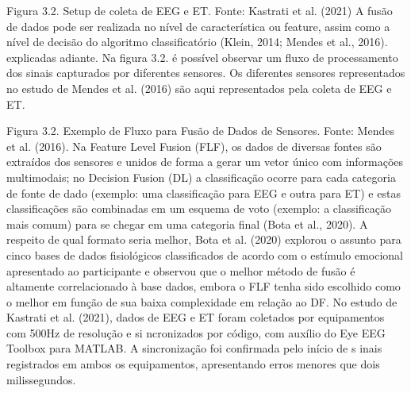Figura 3.2. Setup de coleta de EEG e ET. Fonte: Kastrati et al. (2021)
A fusão de dados pode ser realizada no nível de característica ou feature,
assim como a nível de decisão do algoritmo classificatório (Klein, 2014; Mendes et al., 2016).  explicadas adiante.
      Na figura 3.2. é possível observar um fluxo de processamento dos sinais capturados por diferentes sensores.  Os diferentes 
      sensores representados no estudo de Mendes et al. (2016) são aqui representados pela coleta de EEG e ET.
 

Figura 3.2. Exemplo de Fluxo para Fusão de Dados de Sensores. Fonte:  Mendes et al. (2016).
Na Feature Level Fusion (FLF), os dados de diversas fontes são extraídos dos sensores e unidos de forma a 
gerar um vetor único com informações multimodais; no Decision Fusion (DL) a classificação ocorre para cada categoria 
de fonte de dado (exemplo: uma classificação para EEG e outra para ET) e estas classificações são combinadas em um esquema de voto (exemplo: a classificação mais comum) para se chegar em uma categoria final (Bota et al., 2020). A respeito de qual formato seria melhor, Bota et al. (2020) explorou o assunto para cinco bases de dados fisiológicos classificados de acordo com o estímulo emocional apresentado ao participante e observou que o melhor método de fusão é altamente correlacionado à base dados, embora o FLF tenha sido escolhido como o melhor em função de sua baixa complexidade em relação ao DF. 
No estudo de Kastrati et al. (2021), dados de EEG e ET foram coletados por equipamentos com 500Hz de resolução e si
ncronizados por código, com auxílio do Eye EEG Toolbox para MATLAB. A sincronização foi confirmada pelo início de s
inais registrados em ambos os equipamentos, apresentando erros menores que dois milissegundos. 
